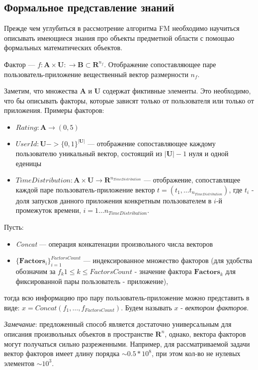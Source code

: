 \documentclass[12pt,a4paper]{report}
\begin{document}
\subsection{Формальное представление знаний}
Прежде чем углубиться в рассмотрение алгоритма FM необходимо научиться описывать имеющиеся знания про объекты предметной области с помощью формальных математических объектов.
\begin{Def}
Фактор --- $f: \textbf{A} \times \textbf{U}: \to \textbf{B} \subset\textbf{R}^{n_ f}$. Отображение сопоставляющее паре пользователь-приложение вещественный вектор размерности $n_f$.
\end{Def}
Заметим, что множества $\textbf{A}$ и $\textbf{U}$ содержат фиктивные элементы. Это необходимо, что бы описывать факторы, которые зависят только от пользователя или только от приложения.
Примеры факторов:
\begin{itemize}
\item$\textit{Rating}: \textbf{A} \to (0,5)$
\item $\textit{UserId}: \textbf{U}->\{0,1\}^{|\textbf{U}|}$ --- отображение сопоставляющее каждому пользователю уникальный вектор, состоящий из $|\textbf{U}| - 1$ нуля и одной еденицы
\item $\textit{TimeDistribution}: \textbf{A} \times \textbf{U} \to \textbf{R}^{n_{TimeDistribution}}$ --- отображение, сопоставлящее каждой паре пользователь-приложение вектор $t = (t_1, \dots t_{n_{TimeDistribution}})$, где $t_i$ - доля запусков данного приложения конкретным пользователем в $i$-й промежуток времени, $i = 1 \dots n_{TimeDistribution}$.
\end{itemize}

Пусть:
\begin{itemize}
\item \textit{Concat} --- операция конкатенации произвольного числа векторов
\item $\{\textbf{Factors}_i\}_{i=1}^{FactorsCount}$ --- индексированное множество факторов (для удобства обозначим за $f_k 1 \le k \le FactorsCount$ - значение фактора $\textbf{Factors}_k$ для фиксированной пары пользователь - приложение),
\end{itemize}
тогда всю информацию про пару пользователь-приложение можно представить в виде: $x = \textit{Concat}(f_1, \dots, f_{FactorsCount})$. Будем называть  $x$  - \textit{вектором факторов}.

\textit{Замечание}: предложенный способ является достаточно универсальным для описания произвольных объектов в пространстве $\textbf{R}^n$, однако, вектора факторов могут получаться сильно разреженными. Например, для рассматриваемой задачи вектор факторов имеет длину порядка $\sim 0.5 * 10^8$, при этом кол-во не нулевых элементов $\sim 10^3$.
\end{document}
